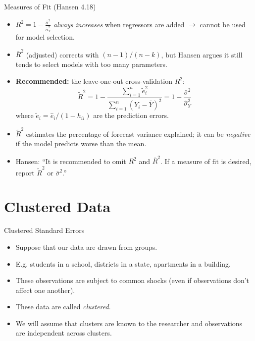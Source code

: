 \documentclass[aspectratio=169]{beamer}
\numberwithin{equation}{section}
\begin{document}
\begin{frame}{Measures of Fit (Hansen 4.18)}
\begin{itemize}
\item $R^2=1-\frac{\hat{\sigma}^2}{\hat{\sigma}_Y^2}$ \emph{always increases} when regressors are added $\rightarrow$ cannot be used for model selection. \pause
\item $\bar{R}^2$ (adjusted) corrects with $(n-1)/(n-k)$, but Hansen argues it still tends to select models with too many parameters. \pause
\item \textbf{Recommended:} the leave-one-out cross-validation $R^2$:
$$\tilde{R}^2=1-\frac{\sum_{i=1}^n\tilde{e}_i^2}{\sum_{i=1}^n(Y_i-\bar{Y})^2}=1-\frac{\bar{\sigma}^2}{\hat{\sigma}_Y^2}$$
where $\tilde{e}_i=\hat{e}_i/(1-h_{ii})$ are the prediction errors. \pause
\item $\tilde{R}^2$ estimates the percentage of forecast variance explained; it can be \emph{negative} if the model predicts worse than the mean. \pause
\item Hansen: ``It is recommended to omit $R^2$ and $\bar{R}^2$.  If a measure of fit is desired, report $\tilde{R}^2$ or $\bar{\sigma}^2$.''
\end{itemize}
\end{frame}


\section{Clustered Data}
\begin{frame}{Clustered Standard Errors}
\begin{itemize}
\item Suppose that our data are drawn from groups.
\item[] E.g. students in a school, districts in a state, apartments in a building.
\item These observations are subject to common shocks (even if observations don't affect one another).
\item These data are called \emph{clustered}.
\item We will assume that clusters are known to the researcher and observations are independent across clusters.
\end{itemize}
\end{frame}
\end{document}
